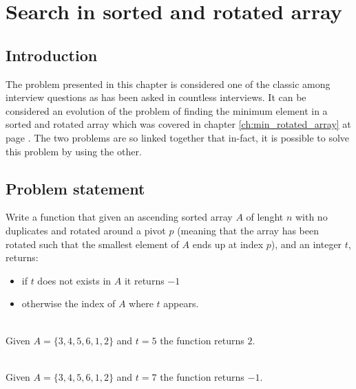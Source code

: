 %

\chapter{Search in sorted and rotated array}
\label{ch:search_sorted_rotated_array}
\section*{Introduction}
The problem presented in this chapter is considered one of the classic among interview questions as has been asked in countless interviews. It can be considered an evolution of the problem of finding the minimum element in a sorted and rotated array which was covered in chapter \ref{ch:min_rotated_array} at page \pageref{ch:min_rotated_array}. The two problems are so linked together that in-fact, it is possible to solve this problem by using the other. 

\section{Problem statement}
\begin{exercise}
Write a function that given an ascending sorted array $A$ of lenght $n$ with no duplicates and rotated around a pivot $p$ (meaning that the array has been rotated such that the smallest element of $A$ ends up at index $p$), and an integer $t$, returns:
\begin{itemize}
	\item if $t$ does not exists in $A$ it returns $-1$ 
	\item otherwise the index of $A$ where $t$ appears.
\end{itemize}


	\begin{example}
		\hfill \\
		Given $A=\{3,4,5,6,1,2\}$ and $t=5$ the function returns $2$.
		
	\end{example}

	\begin{example}
		\hfill \\
		Given $A=\{3,4,5,6,1,2\}$ and $t=7$ the function returns $-1$.
		
	\end{example}
\end{exercise}

